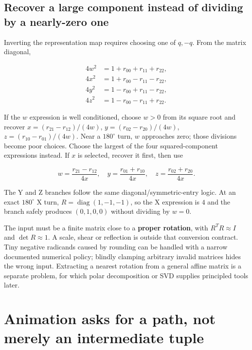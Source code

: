 \subsection{Recover a large component instead of dividing by a nearly-zero one}\label{01-foundations-i-ch019-recover-a-large-component-instead-of-dividing-by-a-nearly-zero-one}

Inverting the representation map requires choosing one of \(q,-q\). From the matrix diagonal,

\[
\begin{aligned}
4w^2&=1+r_{00}+r_{11}+r_{22},\\
4x^2&=1+r_{00}-r_{11}-r_{22},\\
4y^2&=1-r_{00}+r_{11}-r_{22},\\
4z^2&=1-r_{00}-r_{11}+r_{22}.
\end{aligned}
\]

If the \(w\) expression is well conditioned, choose \(w>0\) from its square root and recover \(x=(r_{21}-r_{12})/(4w)\), \(y=(r_{02}-r_{20})/(4w)\), \(z=(r_{10}-r_{01})/(4w)\). Near a \(180^\circ\) turn, \(w\) approaches zero; those divisions become poor choices. Choose the largest of the four squared-component expressions instead. If \(x\) is selected, recover it first, then use

\[
w=\frac{r_{21}-r_{12}}{4x},\quad
y=\frac{r_{01}+r_{10}}{4x},\quad
z=\frac{r_{02}+r_{20}}{4x}.
\]

The Y and Z branches follow the same diagonal/symmetric-entry logic. At an exact \(180^\circ\) X turn, \(R=\operatorname{diag}(1,-1,-1)\), so the X expression is \(4\) and the branch safely produces \((0,1,0,0)\) without dividing by \(w=0\).

The input must be a finite matrix close to a \textbf{proper rotation}, with \(R^TR\approx I\) and \(\det R\approx1\). A scale, shear or reflection is outside that conversion contract. Tiny negative radicands caused by rounding can be handled with a narrow documented numerical policy; blindly clamping arbitrary invalid matrices hides the wrong input. Extracting a nearest rotation from a general affine matrix is a separate problem, for which polar decomposition or SVD supplies principled tools later.

\section{Animation asks for a path, not merely an intermediate tuple}\label{01-foundations-i-ch019-animation-asks-for-a-path-not-merely-an-intermediate-tuple}

